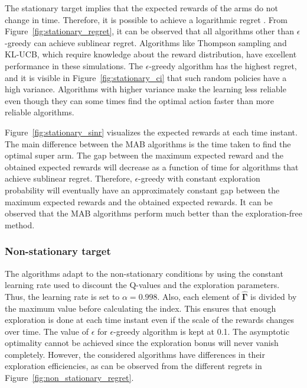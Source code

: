 \documentclass[english, 12pt, a4paper, elec, utf8, a-1b, online]{aaltothesis}
\numberwithin{equation}{section}
\newcommand{\vsinrb}{\widehat{\boldsymbol{\Gamma}}}
\begin{document}
The stationary target implies that the expected rewards of the arms do not change in time.
Therefore, it is possible to achieve a logarithmic regret \cite{Lattimore2019}.
From Figure~\ref{fig:stationary_regret}, it can be observed that all algorithms other than $\epsilon$-greedy can achieve sublinear regret.
Algorithms like Thompson sampling and KL-UCB, which require knowledge about the reward distribution, have excellent performance in these simulations.
The $\epsilon$-greedy algorithm has the highest regret, and it is visible in Figure~\ref{fig:stationary_ci} that such random policies have a high variance.
Algorithms with higher variance make the learning less reliable even though they can some times find the optimal action faster than more reliable algorithms.

Figure~\ref{fig:stationary_sinr} visualizes the expected rewards at each time instant.
The main difference between the MAB algorithms is the time taken to find the optimal super arm.
The gap between the maximum expected reward and the obtained expected rewards will decrease as a function of time for algorithms that achieve sublinear regret.
Therefore, $\epsilon$-greedy with constant exploration probability will eventually have an approximately constant gap between the maximum expected rewards and the obtained expected rewards.
It can be observed that the MAB algorithms perform much better than the exploration-free method.

\subsubsection{Non-stationary target}

The algorithms adapt to the non-stationary conditions by using the constant learning rate used to discount the Q-values and the exploration parameters.
Thus, the learning rate is set to $\alpha = 0.998$.
Also, each element of $\vsinrb$ is divided by the maximum value before calculating the index.
This ensures that enough exploration is done at each time instant even if the scale of the rewards changes over time.
The value of $\epsilon$ for $\epsilon$-greedy algorithm is kept at 0.1.
The asymptotic optimality cannot be achieved since the exploration bonus will never vanish completely.
However, the considered algorithms have differences in their exploration efficiencies, as can be observed from the different regrets in Figure~\ref{fig:non_stationary_regret}.
\end{document}
